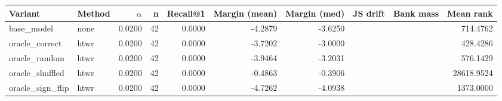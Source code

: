 \begin{tabular}{l l r r r r r r r r}
\toprule
Variant & Method & $\alpha$ & n & Recall@1 & Margin (mean) & Margin (med) & JS drift & Bank mass & Mean rank \\
\midrule
base\_model & none & 0.0200 & 42 & 0.0000 & -4.2879 & -3.6250 &  &  & 714.4762 \\
oracle\_correct & htwr & 0.0200 & 42 & 0.0000 & -3.7202 & -3.0000 &  &  & 428.4286 \\
oracle\_random & htwr & 0.0200 & 42 & 0.0000 & -3.9464 & -3.2031 &  &  & 576.1429 \\
oracle\_shuffled & htwr & 0.0200 & 42 & 0.0000 & -0.4863 & -0.3906 &  &  & 28618.9524 \\
oracle\_sign\_flip & htwr & 0.0200 & 42 & 0.0000 & -4.7262 & -4.0938 &  &  & 1373.0000 \\
\bottomrule
\end{tabular}
